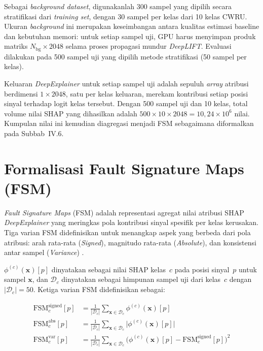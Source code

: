 Sebagai \emph{background dataset}, digunakanlah 300 sampel yang dipilih secara
stratifikasi dari \emph{training set}, dengan 30 sampel per kelas dari 10 kelas
CWRU.
Ukuran \emph{background} ini merupakan keseimbangan antara kualitas estimasi
baseline dan kebutuhan memori: untuk setiap sampel uji, GPU harus menyimpan
produk matriks $N_\text{bg} \times 2048$ selama proses propagasi mundur
\emph{DeepLIFT}.
Evaluasi dilakukan pada 500 sampel uji yang dipilih metode stratifikasi (50 sampel
per kelas).

Keluaran \emph{DeepExplainer} untuk setiap sampel uji adalah sepuluh
\emph{array} atribusi berdimensi $1 \times 2048$, satu per kelas keluaran,
merekam kontribusi setiap posisi sinyal terhadap logit kelas tersebut.
Dengan 500 sampel uji dan 10 kelas, total volume nilai SHAP yang dihasilkan
adalah $500 \times 10 \times 2048 = 10{,}24 \times 10^6$ nilai.
Kumpulan nilai ini kemudian diagregasi menjadi FSM sebagaimana diformalkan
pada Subbab~IV.6.

\section{Formalisasi Fault Signature Maps (FSM)}
\label{sec:bab4_fsm}

\emph{Fault Signature Maps} (FSM) adalah representasi agregat nilai atribusi
SHAP \emph{DeepExplainer} yang meringkas pola kontribusi sinyal spesifik
per kelas kerusakan.
Tiga varian FSM didefinisikan untuk menangkap aspek yang berbeda dari pola
atribusi: arah rata-rata (\emph{Signed}), magnitudo rata-rata (\emph{Absolute}),
dan konsistensi antar sampel (\emph{Variance}) .

$\phi^{(c)}(\mathbf{x})[p]$ dinyatakan sebagai nilai SHAP kelas~$c$ pada
posisi sinyal~$p$ untuk sampel $\mathbf{x}$, dan $\mathcal{D}_c$ dinyatakan sebagai
himpunan sampel uji dari kelas~$c$ dengan $|\mathcal{D}_c| = 50$.
Ketiga varian FSM didefinisikan sebagai:

\begin{align}
  \text{FSM}_c^{\text{signed}}[p]
    &= \frac{1}{|\mathcal{D}_c|}
       \sum_{\mathbf{x} \in \mathcal{D}_c} \phi^{(c)}(\mathbf{x})[p]
  \label{eq:bab4_fsm_signed}\\[4pt]
  \text{FSM}_c^{\text{abs}}[p]
    &= \frac{1}{|\mathcal{D}_c|}
       \sum_{\mathbf{x} \in \mathcal{D}_c} \bigl|\phi^{(c)}(\mathbf{x})[p]\bigr|
  \label{eq:bab4_fsm_abs}\\[4pt]
  \text{FSM}_c^{\text{var}}[p]
    &= \frac{1}{|\mathcal{D}_c|}
       \sum_{\mathbf{x} \in \mathcal{D}_c}
       \bigl(\phi^{(c)}(\mathbf{x})[p] - \text{FSM}_c^{\text{signed}}[p]\bigr)^2
  \label{eq:bab4_fsm_var}
\end{align}

